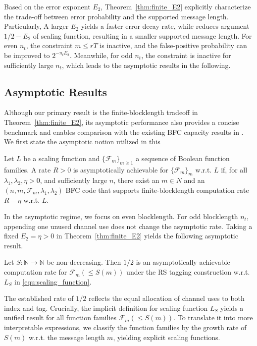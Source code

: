Based on the error exponent $E_2$, Theorem~\ref{thm:finite_E2} explicitly characterize the trade-off between error probability and the supported message length. Particularly, A larger $E_2$ yields a faster error decay rate, while reduces argument $1/2-E_2$ of scaling function, resulting in a smaller supported message length. For even $n_t$, the constraint $m\leq rT$ is inactive, and the false-positive probability can be improved to $2^{-n_tE_2}$.
Meanwhile, for odd $n_t$, the constraint is inactive for sufficiently large $n_t$, which leads to the asymptotic results in the following.


\subsection{Asymptotic Results}

Although our primary result is the finite-blocklength tradeoff in Theorem~\ref{thm:finite_E2}, its asymptotic performance also provides a concise benchmark and enables comparison with the existing BFC capacity results in \cite{BFC,BFC-capacity}. We first state the asymptotic notion utilized in this
\begin{definition}
    \label{def:asymptotic_rate}
    Let $L$ be a scaling function and $\{\mathcal{F}_m\}_{m\geq 1}$ a sequence of Boolean function families. A rate $R>0$ is asymptotically achievable for $\{\mathcal{F}_m\}_m$ w.r.t. $L$ if, for all $\lambda_1,\lambda_2,\eta>0$, and sufficiently large $n$, there exist an $m\in N$ and an $(n,m,\mathcal{F}_m,\lambda_1,\lambda_2)$ BFC code that supports finite-blocklength computation rate $R-\eta$ w.r.t. $L$.
\end{definition}

In the asymptotic regime, we focus on even blocklength. For odd blocklength $n_t$, appending one unused channel use does not change the asymptotic rate. Taking a fixed $E_2=\eta>0$ in Theorem~\ref{thm:finite_E2} yields the following asymptotic result.

\begin{corollary}
    \label{thm:general_asymptotic}
    Let $S:\mathbb{N}\to\mathbb{N}$ be non-decreasing. Then $1/2$ is an asymptotically achievable computation rate for $\mathcal{F}_m(\leq S(m))$ under the RS tagging construction w.r.t. $L_S$ in \eqref{equ:scaling_function}.
\end{corollary}



The established rate of $1/2$ reflects the equal allocation of channel uses to both index and tag. Crucially, the implicit definition for scaling function $L_S$ yields a unified result for all function families $\mathcal{F}_m(\leq S(m))$. To translate it into more interpretable expressions, we classify the function families by the growth rate of $S(m)$ w.r.t. the message length $m$, yielding explicit scaling functions.

